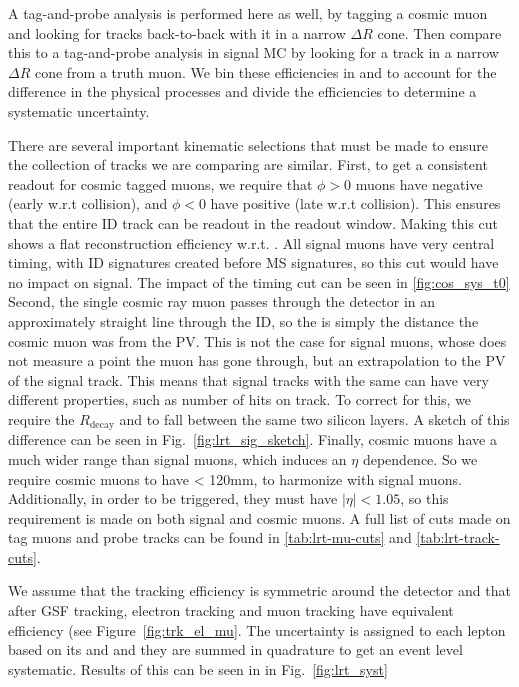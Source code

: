 A tag-and-probe analysis is performed here as well, by tagging a cosmic muon and looking for tracks back-to-back with it in a narrow $\Delta R$ cone. Then compare this to a tag-and-probe analysis in signal \ac{MC} by looking for a track in a narrow $\Delta R$ cone from a truth muon. We bin these efficiencies in \pt and \dz to account for the difference in the physical processes and divide the efficiencies to determine a systematic uncertainty. 

There are several important kinematic selections that must be made to ensure the collection of tracks we are comparing are similar. First, to get a consistent readout for cosmic tagged muons, we require that $\phi > 0$ muons have negative \tavg (early w.r.t collision), and $\phi < 0$ have positive \tavg (late w.r.t collision). This ensures that the entire \ac{ID} track can be readout in the readout window. Making this cut shows a flat reconstruction efficiency w.r.t. \tavg. All signal muons have very central timing, with \ac{ID} signatures created before \ac{MS} signatures, so this cut would have no impact on signal. The impact of the timing cut can be seen in \autoref{fig:cos_sys_t0} Second, the single cosmic ray muon passes through the detector in an approximately straight line through the \ac{ID}, so the \dz is simply the distance the cosmic muon was from the PV. This is not the case for signal muons, whose \dz does not measure a point the muon has gone through, but an extrapolation to the PV of the signal track. This means that signal tracks with the same \dz can have very different properties, such as number of hits on track. To correct for this, we require the $R_{\textrm{decay}}$ and \dz to fall between the same two silicon layers. A sketch of this difference can be seen in Fig.~\ref{fig:lrt_sig_sketch}. Finally, cosmic muons have a much wider \z range than signal muons, which induces an $\eta$ dependence. So we require cosmic muons to have \absz < 120mm, to harmonize with signal muons. Additionally, in order to be triggered, they must have $|\eta| < 1.05$, so this requirement is made on both signal and cosmic muons. A full list of cuts made on tag muons and probe tracks can be found in \autoref{tab:lrt-mu-cuts} and \autoref{tab:lrt-track-cuts}.

 
We assume that the tracking efficiency is symmetric around the detector and that after GSF tracking, electron tracking and muon tracking have equivalent efficiency (see Figure~\ref{fig:trk_el_mu}. The uncertainty is assigned to each lepton based on its \pt and \absdz and they are summed in quadrature to get an event level systematic. Results of this can be seen in in Fig.~\ref{fig:lrt_syst}




